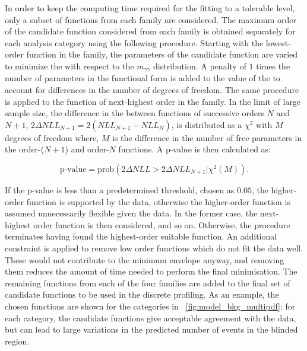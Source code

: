 In order to keep the computing time required for the fitting to a tolerable level, only a subset of functions from each family are considered. The maximum order of the candidate function considered from each family is obtained separately for each analysis category using the following procedure. Starting with the lowest-order function in the family, the parameters of the candidate function are varied to minimize the \NLL with respect to the $m_{\gamma\gamma}$ distribution. A penalty of $1$ times the number of parameters in the functional form is added to the value of the \NLL to account for differences in the number of degrees of freedom. The same procedure is applied to the function of next-highest order in the family. 
In the limit of large sample size, the difference in the \NLL between functions of successive orders $N$ and $N+1$, $2 \Delta NLL_{N+1} = 2(NLL_{N+1} - NLL_{N})$, is distributed as a $\chi^2$ with $M$ degrees of freedom where, $M$ is the difference in the number of free parameters in the order-($N+1$)  and order-$N$ functions. A p-value is then calculated as:

$$ \text{p-value} = \text{prob}(2 \Delta NLL > 2 \Delta NLL_{N+1}| \chi^2(M)). $$

If the p-value is less than a predetermined threshold, chosen as $0.05$, the higher-order function is supported by the data, otherwise the higher-order function is assumed unnecessarily flexible given the data. In the former case, the next-highest order function is then considered, and so on. Otherwise, the procedure terminates having found the highest-order suitable function.  An additional constraint is applied to remove low order functions which do not fit the data well. These would not contribute to the minimum envelope anyway, and removing them reduces the amount of time needed to perform the final minimisation. The remaining functions from each of the four families are added to the final set of candidate functions to be used in the discrete profiling. As an example, the chosen functions are shown for the \Untagged categories in \Fig~\ref{fig:model_bkg_multipdf}: for each category, the candidate functions give acceptable agreement with the data, but can lead to large variations in the predicted number of events in the blinded region.  %


